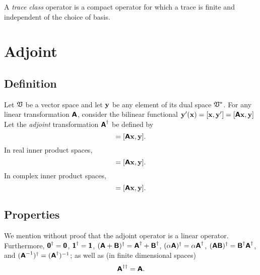 A {\em trace class} operator is a compact operator for which a trace is finite and independent of the choice of basis.

\section{Adjoint}

\subsection{Definition}

Let ${\frak V}$ be a vector space and let ${\bf y}$
be any element of its dual space ${\frak V}^\ast$.
For any linear transformation $\textsf{\textbf{A}}$, consider
the bilinear functional
${\bf y}' ({\bf x}) =[{\bf x} ,{\bf y}'] =[\textsf{\textbf{A}}{\bf x},{\bf y}]$
Let the {\em adjoint} transformation $\textsf{\textbf{A}}^\dagger$ be defined by
\begin{equation}
[{\bf x},\textsf{\textbf{A}}^\ast{\bf y}]=
[\textsf{\textbf{A}}{\bf x},{\bf y}].
\end{equation}
In real inner product spaces,
\begin{equation}
[{\bf x},\textsf{\textbf{A}}^T{\bf y}]=
[\textsf{\textbf{A}}{\bf x},{\bf y}].
\end{equation}
In complex inner product spaces,
\begin{equation}
[{\bf x},\textsf{\textbf{A}}^\dagger{\bf y}]=
[\textsf{\textbf{A}}{\bf x},{\bf y}].
\end{equation}


\subsection{Properties}
We mention without proof that the adjoint operator is a linear operator.
Furthermore,
$\textsf{\textbf{0}}^\dagger = \textsf{\textbf{0}}$,
$\textsf{\textbf{1}}^\dagger = \textsf{\textbf{1}}$,
$(\textsf{\textbf{A}}+\textsf{\textbf{B}})^\dagger = \textsf{\textbf{A}}^\dagger+\textsf{\textbf{B}}^\dagger$,
$(\alpha \textsf{\textbf{A}})^\dagger = \alpha \textsf{\textbf{A}}^\dagger$,
$( \textsf{\textbf{A}}\textsf{\textbf{B}})^\dagger =   \textsf{\textbf{B}}^\dagger
 \textsf{\textbf{A}}^\dagger$,
and
$( \textsf{\textbf{A}}^{-1})^\dagger
=
( \textsf{\textbf{A}}^\dagger )^{-1}
$;
as well as  (in finite dimensional spaces)
\begin{equation}
\textsf{\textbf{A}}^{\dagger \dagger}=
\textsf{\textbf{A}}.
\end{equation}

